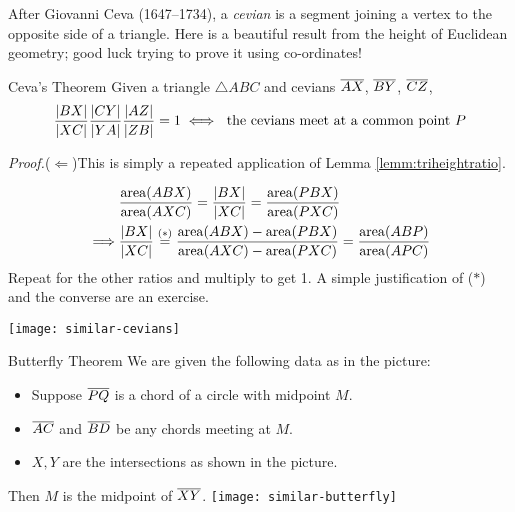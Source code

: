 After Giovanni Ceva (1647--1734), a \emph{cevian} is a segment joining a vertex to the opposite side of a triangle. Here is a beautiful result from the height of Euclidean geometry; good luck trying to prove it using co-ordinates!

\begin{thm}{Ceva's Theorem}{}
Given a triangle $\triangle ABC$ and cevians $\overline{AX}$, $\overline{BY}$, $\overline{CZ}$,
\[\frac{\left| BX\right|}{\left| XC\right|}\frac{\left| CY\right|}{\left| YA\right|}\frac{\left| AZ\right|}{\left| ZB\right|}=1\iff\text{ the cevians meet at a common point $P$}\] 
\end{thm}

\begin{tcolorbox}[proofstyle]
\emph{Proof.}\lstsp($\Leftarrow$)\quad This is simply a repeated application of Lemma \ref{lemm:triheightratio}.\par
\begin{minipage}[t]{0.65\linewidth}\vspace{-15pt}
\begin{align*}
 &\frac{\operatorname{area}(ABX)}{\operatorname{area}(AXC)}=\frac{\left| BX\right|}{\left| XC\right|} =\frac{\operatorname{area}(PBX)}{\operatorname{area}(PXC)}\\
\implies&\frac{\left| BX\right|}{\left| XC\right|}\overset{\text{($\ast$)}}{=}\frac{\operatorname{area}(ABX)-\operatorname{area}(PBX)}{\operatorname{area}(AXC)-\operatorname{area}(PXC)}=\frac{\operatorname{area}(ABP)}{\operatorname{area}(APC)}
\end{align*}
Repeat for the other ratios and multiply to get 1.\smallbreak
A simple justification of ($\ast$) and the converse are an exercise.
\end{minipage}\hfill\begin{minipage}[t]{0.35\linewidth}\vspace{-15pt} 
\flushright\texttt{[image: similar-cevians]}\\[-5pt]\hfill\qedsymbol
\end{minipage}
\end{tcolorbox}

\goodbreak

\begin{thm}[lower separated=false, sidebyside, sidebyside align=top seam, sidebyside gap=0pt, righthand width=0.3\linewidth]{Butterfly Theorem}{}
We are given the following data as in the picture:
\begin{itemize}
  \item Suppose $\overline{PQ}$ is a chord of a circle with midpoint $M$.
  \item $\overline{AC}$ and $\overline{BD}$ be any chords meeting at $M$.
  \item $X,Y$ are the intersections as shown in the picture.
\end{itemize}
Then $M$ is the midpoint of $\overline{XY}$.
\tcblower
\flushright\texttt{[image: similar-butterfly]}
\end{thm}

